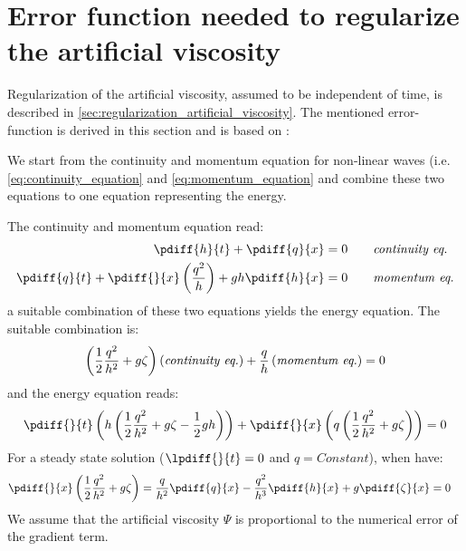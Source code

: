 \chapter{Error function needed to regularize the artificial viscosity} \label{sec:error_artificial_viscosity}
Regularization of the artificial viscosity, assumed to be independent of time, is described in \autoref{sec:regularization_artificial_viscosity}.
The mentioned error-function is derived in this section and is based on \citet[eq.\ 42]{Borsboom2001}:

We start from the continuity and momentum equation for non-linear waves (i.e. \autoref{eq:continuity_equation} and \eqref{eq:momentum_equation} and combine these two equations to one equation representing the energy.

The continuity and momentum equation read:
\begin{align}
    \pdiff{h}{t}  + \pdiff{q}{x} & = 0 \qquad \textit{continuity eq.}
    \\
    \pdiff{q}{t}  + \pdiff{}{x} \left( \frac{q^2}{h} \right) + g h \pdiff{h}{x} & = 0 \qquad \textit{momentum eq.}
\end{align}
a suitable combination of these two equations yields the energy equation.
The suitable combination is:
\begin{align}
    \left( \frac{1}{2} \frac{q^2}{h^2} + g \zeta\right)\left(\textit{continuity eq.}\right)
    +
    \frac{q}{h} \left( \textit{momentum eq.} \right)= 0
\end{align}
and the energy equation reads:
\begin{align}
    \pdiff{}{t}\left( h \left(\half \frac{q^2}{h^2} + g \zeta - \half g h \right) \right) +
    \pdiff{}{x}\left( q \left( \half \frac{q^2}{h^2} + g\zeta  \right) \right)= 0
\end{align}
For a steady state solution ($\lpdiff{}{t} = 0$ and $q=\textit{Constant}$), when have:
\begin{align}
    &\pdiff{}{x}\left( \frac{1}{2} \frac{q^2}{h^2} + g\zeta  \right) =
\frac{q}{h^2} \pdiff{q}{x} - \frac{q^2}{h^3}  \pdiff{h}{x} + g\pdiff{\zeta}{x} = 0
\end{align}
We assume that the artificial viscosity $\Psi$ is proportional to the numerical error of the gradient term.
%
